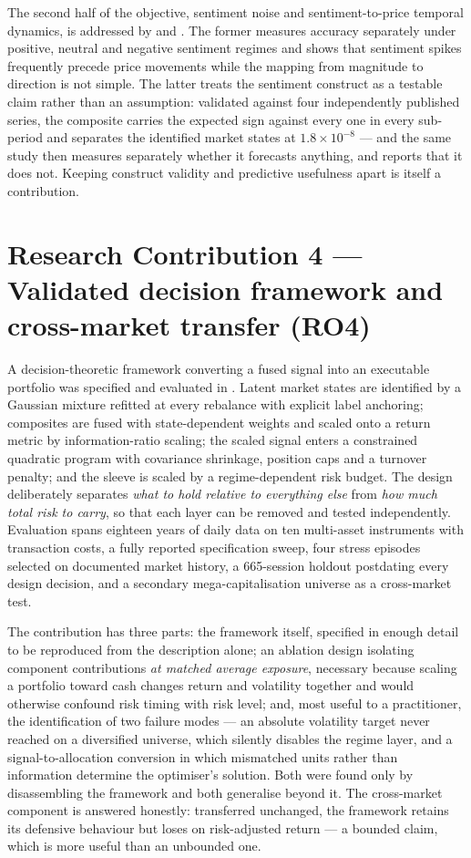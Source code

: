The second half of the objective, sentiment noise and sentiment-to-price temporal dynamics, is
addressed by  and . The former measures accuracy separately under
positive, neutral and negative sentiment regimes and shows that sentiment spikes frequently
precede price movements while the mapping from magnitude to direction is not simple. The latter
treats the sentiment construct as a testable claim rather than an assumption: validated against
four independently published series, the composite carries the expected sign against every one
in every sub-period and separates the identified market states at $1.8 \times 10^{-8}$ --- and
the same study then measures separately whether it forecasts anything, and reports that it does
not. Keeping construct validity and predictive usefulness apart is itself a contribution.

\section{Research Contribution 4 --- Validated decision framework and cross-market transfer
(RO4)}

A decision-theoretic framework converting a fused signal into an executable portfolio was
specified and evaluated in . Latent market states are identified by a Gaussian
mixture refitted at every rebalance with explicit label anchoring; composites are fused with
state-dependent weights and scaled onto a return metric by information-ratio scaling; the scaled
signal enters a constrained quadratic program with covariance shrinkage, position caps and a
turnover penalty; and the sleeve is scaled by a regime-dependent risk budget. The design
deliberately separates \emph{what to hold relative to everything else} from \emph{how much total
risk to carry}, so that each layer can be removed and tested independently. Evaluation spans
eighteen years of daily data on ten multi-asset instruments with transaction costs, a fully
reported specification sweep, four stress episodes selected on documented market history, a
665-session holdout postdating every design decision, and a secondary mega-capitalisation
universe as a cross-market test.

The contribution has three parts: the framework itself, specified in enough detail to be
reproduced from the description alone; an ablation design isolating component contributions
\emph{at matched average exposure}, necessary because scaling a portfolio toward cash changes
return and volatility together and would otherwise confound risk timing with risk level; and,
most useful to a practitioner, the identification of two failure modes --- an absolute
volatility target never reached on a diversified universe, which silently disables the regime
layer, and a signal-to-allocation conversion in which mismatched units rather than information
determine the optimiser's solution. Both were found only by disassembling the framework and
both generalise beyond it. The cross-market component is answered honestly: transferred
unchanged, the framework retains its defensive behaviour but loses on risk-adjusted return ---
a bounded claim, which is more useful than an unbounded one.

